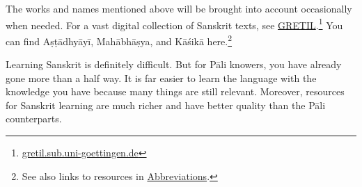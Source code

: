 The works and names mentioned above will be brought into account occasionally when needed. For a vast digital collection of Sanskrit texts, see \href{https://gretil.sub.uni-goettingen.de/}{GRETIL}.\footnote{\url{gretil.sub.uni-goettingen.de}} You can find Aṣṭādhyāyī, Mahābhāṣya, and Kāśikā here.\footnote{See also links to resources in \hyperref[chap:abbrev]{Abbreviations}.}

Learning Sanskrit is definitely difficult. But for Pāli knowers, you have already gone more than a half way. It is far easier to learn the language with the knowledge you have because many things are still relevant. Moreover, resources for Sanskrit learning are much richer and have better quality than the Pāli counterparts.

